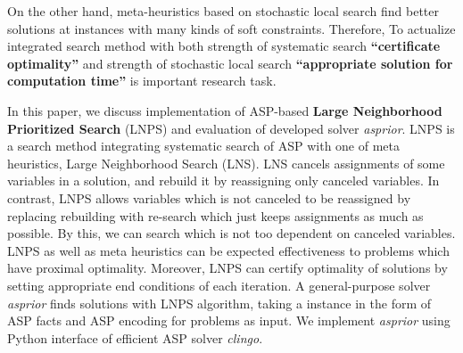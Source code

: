 \documentclass[dvipdfmx,a4paper]{jsarticle}
\begin{document}
On the other hand, 
meta-heuristics based on 
stochastic local search 
find better solutions 
at instances with many kinds of 
soft constraints. 
Therefore, 
To actualize integrated search method 
with both strength of systematic search 
\textbf{``certificate optimality''} 
and strength of stochastic local search 
\textbf{``appropriate solution for computation time''} 
is important research task.


In this paper, 
we discuss implementation of 
ASP-based \textbf{Large Neighborhood Prioritized Search} (LNPS) 
and evaluation of developed solver \textit{asprior}. 
LNPS is a search method 
integrating systematic search of ASP with 
one of meta heuristics, Large Neighborhood Search (LNS). 
LNS cancels assignments of 
some variables in a solution, 
and rebuild it by reassigning only canceled variables. 
In contrast, LNPS 
allows variables which is not canceled 
to be reassigned 
by replacing rebuilding with 
re-search which just keeps assignments 
as much as possible. 
By this, we can search 
which is not too dependent on 
canceled variables. 
LNPS as well as meta heuristics 
can be expected effectiveness to 
problems which have 
proximal optimality. 
Moreover, LNPS can certify 
optimality of solutions by 
setting appropriate end conditions of each iteration. 
A general-purpose solver \textit{asprior} finds solutions 
with LNPS algorithm, 
taking a instance in the form of ASP facts and 
ASP encoding for problems as input. 
We implement \textit{asprior} using 
Python interface of efficient ASP solver \textit{clingo}.
\end{document}
